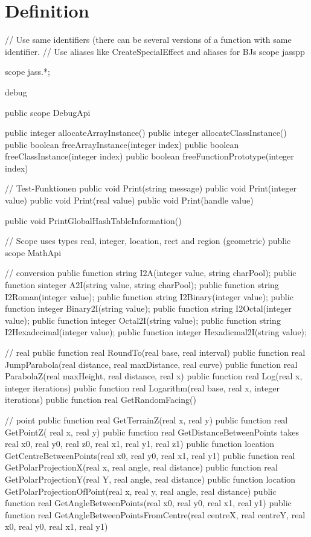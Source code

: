\section{Definition}
// Use same identifiers (there can be several versions of a function with same identifier.
// Use aliases like CreateSpecialEffect and aliases for BJs
scope jasspp
{
	scope jass.*;

	debug
	{
		public scope DebugApi
		{
			public integer allocateArrayInstance()
			public integer allocateClassInstance()
			public boolean freeArrayInstance(integer index)
			public boolean freeClassInstance(integer index)
			public boolean freeFunctionPrototype(integer index)

			// Test-Funktionen
			public void Print(string message)
			public void Print(integer value)
			public void Print(real value)
			public void Print(handle value)

			public void PrintGlobalHashTableInformation()
		}
	}

	// Scope uses types real, integer, location, rect and region (geometric)
	public scope MathApi
	{
		// conversion
		public function string I2A(integer value, string charPool);
		public function sinteger A2I(string value, string charPool);
		public function string I2Roman(integer value);
		public function string	I2Binary(integer value);
		public function integer Binary2I(string value);
		public function string	I2Octal(integer value);
		public function integer Octal2I(string value);
		public function string I2Hexadecimal(integer value);
		public function integer Hexadicmal2I(string value);

		// real
		public function real RoundTo(real base, real interval)
		public function real JumpParabola(real distance, real maxDistance, real curve)
		public function real ParabolaZ(real maxHeight, real distance, real x)
		public function real Log(real x, integer iterations)
		public function real Logarithm(real base, real x, integer iterations)
		public function real GetRandomFacing()

		// point
		public function real GetTerrainZ(real x, real y)
		public function real GetPointZ( real x, real y)
		public function real GetDistanceBetweenPoints takes real x0, real y0, real z0, real x1, real y1, real z1)
		public function location GetCentreBetweenPoints(real x0, real y0, real x1, real y1)
		public function real GetPolarProjectionX(real x, real angle, real distance)
		public function real GetPolarProjectionY(real Y, real angle, real distance)
		public function location GetPolarProjectionOfPoint(real x, real y, real angle, real distance)
		public function real GetAngleBetweenPoints(real x0, real y0, real x1, real y1)
		public function real GetAngleBetweenPointsFromCentre(real centreX, real centreY, real x0, real y0, real x1, real y1)


}}
